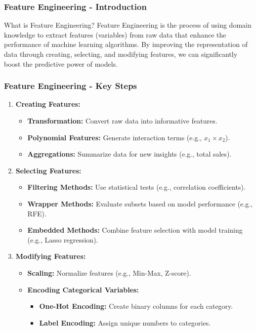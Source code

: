 \documentclass[aspectratio=169]{beamer}
\begin{document}
\begin{frame}[fragile]
    \frametitle{Feature Engineering - Introduction}
    \begin{block}{What is Feature Engineering?}
        Feature Engineering is the process of using domain knowledge to extract features (variables) from raw data that enhance the performance of machine learning algorithms. By improving the representation of data through creating, selecting, and modifying features, we can significantly boost the predictive power of models.
    \end{block}
\end{frame}

\begin{frame}[fragile]
    \frametitle{Feature Engineering - Key Steps}
    \begin{enumerate}
        \item \textbf{Creating Features:}
            \begin{itemize}
                \item \textbf{Transformation:} Convert raw data into informative features.
                \item \textbf{Polynomial Features:} Generate interaction terms (e.g., \(x_1 \times x_2\)).
                \item \textbf{Aggregations:} Summarize data for new insights (e.g., total sales).
            \end{itemize}

        \item \textbf{Selecting Features:}
            \begin{itemize}
                \item \textbf{Filtering Methods:} Use statistical tests (e.g., correlation coefficients).
                \item \textbf{Wrapper Methods:} Evaluate subsets based on model performance (e.g., RFE).
                \item \textbf{Embedded Methods:} Combine feature selection with model training (e.g., Lasso regression).
            \end{itemize}

        \item \textbf{Modifying Features:}
            \begin{itemize}
                \item \textbf{Scaling:} Normalize features (e.g., Min-Max, Z-score).
                \item \textbf{Encoding Categorical Variables:}
                    \begin{itemize}
                        \item \textbf{One-Hot Encoding:} Create binary columns for each category.
                        \item \textbf{Label Encoding:} Assign unique numbers to categories.
                    \end{itemize}
            \end{itemize}
    \end{enumerate}
\end{frame}
\end{document}
